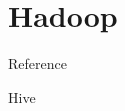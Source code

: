 \section{Hadoop}

Reference \cite{ghemawat2003google, shvachko2010hadoop, white2012hadoop}

Hive \cite{thusoo2009hive}